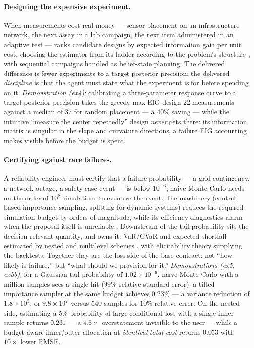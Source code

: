 \documentclass[11pt,a4paper]{article}
\begin{document}
\paragraph{Designing the expensive experiment.} When measurements cost real
money --- sensor placement on an infrastructure network, the next assay in
a lab campaign, the next item administered in an adaptive test ---
 ranks candidate designs by expected
information gain per unit cost, choosing the estimator from its ladder
according to the problem's structure \citep{long2013,beck2018,ryan2016},
with sequential campaigns handled as belief-state planning. The delivered
difference is fewer experiments to a target posterior precision; the
delivered \emph{discipline} is that the agent must state what the
experiment is for before spending on it. \emph{Demonstration (ex4):}
calibrating a three-parameter response curve to a target posterior
precision takes the greedy max-EIG design 22 measurements against a median
of 37 for random placement --- a $40\%$ saving --- while the intuitive
``measure the center repeatedly'' design \emph{never} gets there: its
information matrix is singular in the slope and curvature directions, a
failure EIG accounting makes visible before the budget is spent.

\paragraph{Certifying against rare failures.} A reliability engineer must
certify that a failure probability --- a grid contingency, a network
outage, a safety-case event --- is below $10^{-6}$; naive Monte Carlo needs
on the order of $10^{8}$ simulations to even see the event. The
 machinery (control-based importance sampling,
splitting for dynamic systems) reduces the required simulation budget by
orders of magnitude, while its efficiency diagnostics alarm when the
proposal itself is unreliable \citep{bucklew2004,rubino2009}. Downstream of
the tail probability sits the decision-relevant quantity, and
 owns it: VaR/CVaR and expected
shortfall estimated by nested and multilevel schemes
\citep{rockafellar2000,giles2019}, with elicitability theory
\citep{gneiting2011} supplying the backtests. Together they are the loss
side of the base contract: not ``how likely is failure,'' but ``what should
we provision for it.'' \emph{Demonstrations (ex5, ex5b):} for a Gaussian
tail probability of $1.02\times 10^{-6}$, naive Monte Carlo with a million
samples sees a single hit ($99\%$ relative standard error); a tilted
importance sampler at the same budget achieves $0.23\%$ --- a variance
reduction of $1.8\times 10^{5}$, or $9.8\times 10^{7}$ versus $540$ samples
for $10\%$ relative error. On the nested side, estimating a $5\%$
probability of large conditional loss with a single inner sample returns
$0.231$ --- a $4.6\times$ overstatement invisible to the user --- while a
budget-aware inner/outer allocation at \emph{identical total cost} returns
$0.053$ with $10\times$ lower RMSE.
\end{document}
